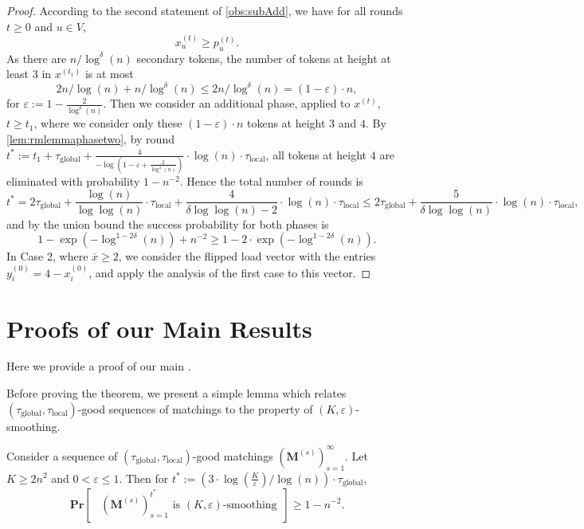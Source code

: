\documentclass[twoside,leqno]{article}
\newcommand{\Pro}[1]{\mathbf{Pr} \left[\,#1\,\right]}
\newcommand{\M}{\mathbf{M}}
\DeclareMathOperator{\1}{\mathbf{1}}
\newcommand{\taulocal}{\tau_{\mathrm{local}}}
\newcommand{\tauglobal}{\tau_{\mathrm{global}}}
\numberwithin{equation}{section}
\let\epsilon\varepsilon
\begin{document}
\begin{proof}
According to the second statement of \cref{obs:subAdd}, we have for all rounds $t \geq 0$ and $u \in V$,
\[
 x_u^{(t)} \geq 
 p_u^{(t)}.
\]
As there are $n/\log^{\delta} (n)$ secondary tokens, the number of tokens at height at least $3$ in $x^{(t_1)}$ 
is at most $$2n/\log (n) + n/\log^{\delta} (n) \leq 2 n/ \log^{\delta}(n)=(1-\epsilon) \cdot n,$$ for $\epsilon:=1-\frac{2}{\log^{\delta}(n)} $. Then we consider an additional phase, applied to $x^{(t)}$, $t \geq t_1$, where we consider only these $(1-\epsilon) \cdot n$ tokens at height $3$ and $4$. By \cref{lem:rmlemmaphasetwo}, by round $t^*:=t_1+ \tauglobal+\frac{4}{-\log \left(1 - \epsilon + \frac{2}{\log^4 (n)} \right)} \cdot \log(n) \cdot \taulocal$, all tokens at height $4$ are eliminated with probability $1-n^{-2}$. Hence the total number of rounds is
\[
 t^{*} = 2 \tauglobal + \frac{\log(n)}{\log\log(n)} \cdot \taulocal + \frac{4}{\delta \log \log(n) -2} \cdot \log(n) \cdot \taulocal 
 \leq 2 \tauglobal + \frac{5}{\delta \log \log(n)} \cdot \log(n) \cdot \taulocal,
\]
and by the union bound the success probability for both phases is
\[
  1 -  \exp\left( -\log^{1-2  \delta} (n) \right) + n^{-2} \geq 1 - 2 \cdot \exp\left(-\log^{1-2  \delta} (n) \right).
\]
In Case 2, where $\overline{x} \geq 2$, we consider the flipped load vector with the entries $y_i^{(0)} = 4-x^{(0)}_{i}$, and apply the analysis of the first case to this vector. 
\end{proof}



\section{Proofs of our Main Results}\label{sec:proofsmainresults}

Here we provide a proof of our main .


Before proving the theorem, we present a simple lemma which relates $(\tauglobal,\taulocal)$-good sequences of matchings to the property of $(K,\epsilon)$-smoothing.
\begin{lemma}
\label{lem:TauglobalSmoothingRelation}
Consider a sequence of $(\tauglobal,\taulocal)$-good matchings $\left(\M^{(s)}\right)_{s=1}^{\infty}$.
Let $K\ge 2n^2$ and $0<\epsilon\le 1$. Then for $t^* := (3\cdot \log (\frac{K}{\epsilon})/\log(n))\cdot \tauglobal$,
\[
 \Pro{ \text{ $\left(\M^{(s)}\right)_{s=1}^{t^{*}}$ is $(K,\epsilon)$-smoothing }} \geq 1-n^{-2}. 
\]
\end{lemma}
\end{document}
